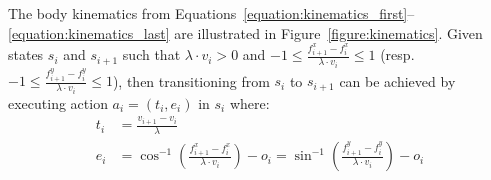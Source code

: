 \documentclass[10pt]{article}
\theoremstyle{plain}
\begin{document}
The body kinematics from Equations~\ref{equation:kinematics_first}--\ref{equation:kinematics_last} are illustrated in Figure~\ref{figure:kinematics}.
Given states $s_{i}$ and $s_{i+1}$ such that $\lambda \cdot v_{i} > 0$ and $-1 \le \frac{f_{i+1}^{x} - f_{i}^{x}}{\lambda \cdot v_{i}} \le 1$ (resp.\ $-1 \le \frac{f_{i+1}^{y} - f_{i}^{y}}{\lambda \cdot v_{i}} \le 1$), then transitioning from $s_{i}$ to $s_{i+1}$ can be achieved by executing action $a_{i} = (t_{i}, e_{i})$ in $s_{i}$ where:
\begin{align}
    t_{i} & = \frac{v_{i+1} - v_{i}}{\lambda} \\
    e_{i} & = \cos^{-1}{\left( \frac{f_{i+1}^{x} - f_{i}^{x}}{\lambda \cdot v_{i}} \right) - o_{i}} = \sin^{-1}{\left( \frac{f_{i+1}^{y} - f_{i}^{y}}{\lambda \cdot v_{i}} \right) - o_{i}}
\end{align}
\end{document}
